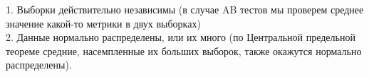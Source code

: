 1. Выборки действительно независимы (в случае AB тестов мы проверем среднее значение какой-то метрики в двух выборках) \\ 
2. Данные нормально распределены, или их много (по Центральной предельной теореме средние, насемпленные их больших выборок, также окажутся нормально распределены). 
